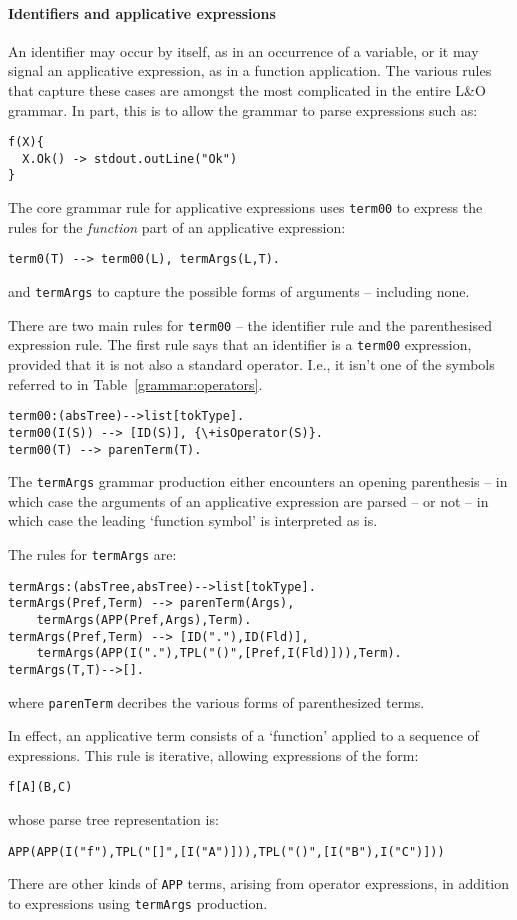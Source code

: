 \paragraph{Identifiers and applicative expressions}
An identifier may occur by itself, as in an occurrence of a variable, or it may signal an applicative expression, as in a function application. The various rules that capture these cases are amongst the most complicated in the entire L&O grammar. In part, this is to allow the grammar to parse expressions such as:
\begin{verbatim}
f(X){
  X.Ok() -> stdout.outLine("Ok")
}
\end{verbatim}

The core grammar rule for applicative expressions uses \verb+term00+ to express the rules for the \emph{function} part of an applicative expression:
\begin{verbatim}
term0(T) --> term00(L), termArgs(L,T).
\end{verbatim}
and \verb+termArgs+ to capture the possible forms of arguments -- including none.

There are two main rules for \verb+term00+ -- the identifier rule and the parenthesised expression rule. The first rule says that an identifier is a \verb+term00+ expression, provided that it is not also a standard operator. I.e., it isn't one of the symbols referred to in Table~\vref{grammar:operators}. 
\begin{verbatim}
term00:(absTree)-->list[tokType].
term00(I(S)) --> [ID(S)], {\+isOperator(S)}.
term00(T) --> parenTerm(T).
\end{verbatim}

The \verb+termArgs+ grammar production either encounters an opening parenthesis -- in which case the arguments of an applicative expression are parsed -- or not -- in which case the leading `function symbol' is interpreted as is.

The rules for \verb+termArgs+ are:
\begin{verbatim}
termArgs:(absTree,absTree)-->list[tokType].
termArgs(Pref,Term) --> parenTerm(Args),
    termArgs(APP(Pref,Args),Term).
termArgs(Pref,Term) --> [ID("."),ID(Fld)],
    termArgs(APP(I("."),TPL("()",[Pref,I(Fld)])),Term).
termArgs(T,T)-->[].
\end{verbatim}
where \verb+parenTerm+ decribes the various forms of parenthesized terms.

In effect, an applicative term consists of a `function' applied to a sequence of expressions. This rule is iterative, allowing expressions of the form:
\begin{verbatim}
f[A](B,C)
\end{verbatim}
whose parse tree representation is:
\begin{verbatim}
APP(APP(I("f"),TPL("[]",[I("A")])),TPL("()",[I("B"),I("C")]))
\end{verbatim}
There are other kinds of \verb+APP+ terms, arising from operator expressions, in addition to expressions using \verb+termArgs+ production. 

